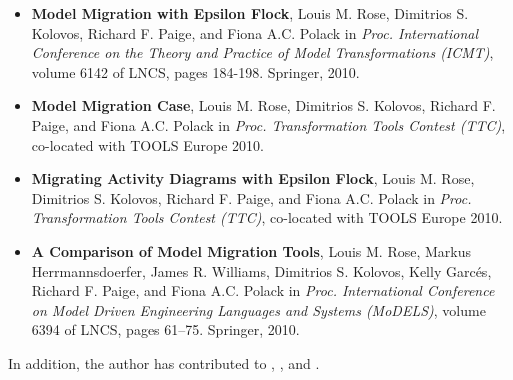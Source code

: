 {\begin{itemize}
		\item \textbf{Model Migration with Epsilon Flock}, Louis M. Rose, Dimitrios S. Kolovos, Richard F. Paige, and Fiona A.C. Polack in \textit{Proc. International Conference on the Theory and Practice of Model Transformations (ICMT)}, volume 6142 of LNCS, pages 184-198. Springer, 2010.
	
		\item \textbf{Model Migration Case}, Louis M. Rose, Dimitrios S. Kolovos, Richard F. Paige, and Fiona A.C. Polack in \textit{Proc. Transformation Tools Contest (TTC)}, co-located with TOOLS Europe 2010.
	
		\item \textbf{Migrating Activity Diagrams with Epsilon Flock}, Louis M. Rose, Dimitrios S. Kolovos, Richard F. Paige, and Fiona A.C. Polack in \textit{Proc. Transformation Tools Contest (TTC)}, co-located with TOOLS Europe 2010.
		
		\item \textbf{A Comparison of Model Migration Tools}, Louis M. Rose, Markus Herrmannsdoerfer, James R. Williams, Dimitrios S. Kolovos, Kelly Garc\'{e}s, Richard F. Paige, and Fiona A.C. Polack in \textit{Proc. International Conference on Model Driven Engineering Languages and Systems (MoDELS)}, volume 6394 of LNCS, pages 61–75. Springer, 2010.
	\end{itemize}

	In addition, the author has contributed to \cite{kolovos07ewl}, \cite{paige08fptc}, \cite{kolovos10eugenia} and \cite{rose10coevolution}.
}